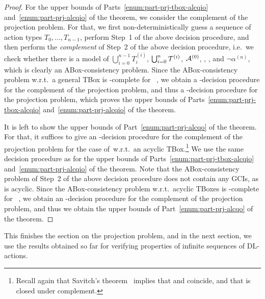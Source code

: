 \begin{proof}
        For the upper bounds of Parts~\ref{enum:part-prj-tbox-alcqio}
        and~\ref{enum:part-prj-alcqio} of the theorem, we consider the
        complement of the projection problem.  For that, we first
        non-deterministically guess a sequence of action types
        $T_0,\dots,T_{n-1}$, perform Step~1 of the above decision procedure,
        and then perform the \emph{complement} of Step~2 of the above decision
        procedure, i.e.~we check whether there is a model of
        $\bigcup_{i=0}^{n-1}T_i^{(i)}$, $\bigcup_{i=0}^n\mathcal{T}^{(i)}$,
        $\mathcal{A}^{(0)}$, \Ared, \Tred, and $\lnot\alpha^{(n)}$, which is clearly an
        ABox-consistency problem.  Since the ABox-consistency problem w.r.t.\ a
        general TBox is \NExpTime-complete for
        \ALCQIO~\cite{Sch-DKE94,Tob-JAIR00,Pra-JLLI05}, we obtain a
        \NExpTime-decision procedure for the complement of the projection
        problem, and thus a \coNExpTime-decision procedure for the projection
        problem, which proves the upper bounds of
        Parts~\ref{enum:part-prj-tbox-alcqio} and~\ref{enum:part-prj-alcqio} of
        the theorem.

        It is left to show the upper bounds of Part~\ref{enum:part-prj-alcqo} of
        the theorem.  For that, it suffices to give an \NPSpace-decision
        procedure for the complement of the projection problem for the case
        of~\ALCQO w.r.t.\ an acyclic TBox.\footnote{%
            Recall again that Savitch's theorem~\cite{Sav-JCSS70} implies that
            \NPSpace and \PSpace coincide, and that \PSpace is closed under
            complement.}
        We use the same decision procedure as for the upper bounds of
        Parts~\ref{enum:part-prj-tbox-alcqio} and~\ref{enum:part-prj-alcqio} of
        the theorem.  Note that the ABox-consistency problem of Step~2 of the
        above decision procedure does not contain any GCIs, as \Tred is acyclic.
        Since the ABox-consistency problem w.r.t.\ acyclic TBoxes is
        \PSpace-complete for \ALCQO~\cite{Sch-DKE94,BLM+-LTCS-05-02}, we obtain
        an \NPSpace-decision procedure for the complement of the projection
        problem, and thus we obtain the upper bounds of
        Part~\ref{enum:part-prj-alcqo} of the theorem.
\end{proof}

\noindent
This finishes the section on the projection problem, and in the next section, we
use the results obtained so far for verifying properties of infinite sequences
of DL-actions.


